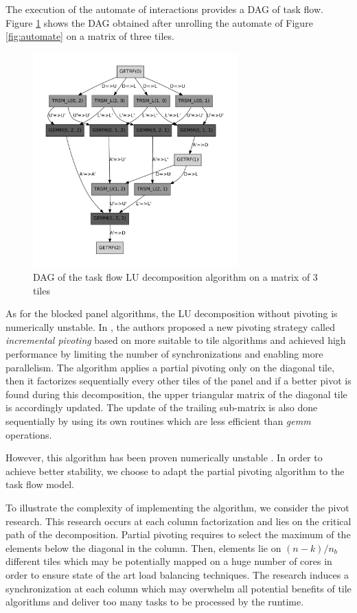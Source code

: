 The execution of the automate of interactions provides a DAG of task flow. Figure \ref{fig:dag_dgetrf} shows the DAG obtained after unrolling the automate of Figure \ref{fig:automate} on a matrix of three tiles.

\begin{figure}[!ht]
\centering
\includegraphics[width=0.7\textwidth]{figures/dag_getrf.pdf}
\caption{DAG of the task flow LU decomposition algorithm  on a matrix of 3 tiles \label{fig:dag_dgetrf}}
\end{figure}

As for the blocked panel algorithms, the LU decomposition without pivoting is numerically unstable. In \cite{Buttari09}, the authors proposed a new pivoting strategy called \emph{incremental pivoting} based on \cite{Quintana-Orti:2009:ULF} more suitable to tile algorithms and achieved high performance by limiting the number of synchronizations and enabling more parallelism. The algorithm applies a partial pivoting only on the diagonal tile, then it factorizes sequentially every other tiles of the panel and if a better pivot is found during this decomposition, the upper triangular matrix of the diagonal tile is accordingly updated. The update of the trailing sub-matrix is also done sequentially by using its own routines which are less efficient than \emph{gemm} operations.


However, this algorithm has been proven numerically unstable \cite{journals/siammax/GrigoriDX11}. In order to achieve better stability, we choose to adapt the partial pivoting algorithm to the task flow model.

To illustrate the complexity of implementing the algorithm, we consider the pivot research. This research occurs at each column factorization and lies on the critical path of the decomposition. Partial pivoting requires to select the maximum of the elements below the diagonal in the column. Then, elements lie on $(n-k)/n_b$ different tiles which may be potentially mapped on a huge number of cores in order to ensure state of the art load balancing techniques. The research induces a synchronization at each column which may overwhelm all potential benefits of tile algorithms and deliver too many tasks to be processed by the runtime.

